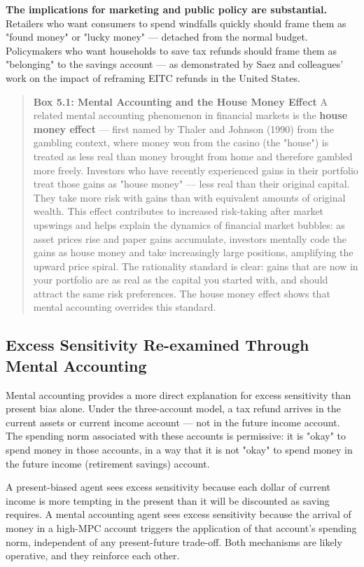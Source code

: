 \documentclass[12pt, letterpaper]{article}
\begin{document}
\textbf{The implications for marketing and public policy are substantial.} Retailers who want consumers to spend windfalls quickly should frame them as "found money" or "lucky money" --- detached from the normal budget. Policymakers who want households to save tax refunds should frame them as "belonging" to the savings account --- as demonstrated by Saez and colleagues' work on the impact of reframing EITC refunds in the United States.

\begin{quote}
\textbf{Box 5.1: Mental Accounting and the House Money Effect}
A related mental accounting phenomenon in financial markets is the \textbf{house money effect} --- first named by Thaler and Johnson (1990) from the gambling context, where money won from the casino (the "house") is treated as less real than money brought from home and therefore gambled more freely.
Investors who have recently experienced gains in their portfolio treat those gains as "house money" --- less real than their original capital. They take more risk with gains than with equivalent amounts of original wealth. This effect contributes to increased risk-taking after market upswings and helps explain the dynamics of financial market bubbles: as asset prices rise and paper gains accumulate, investors mentally code the gains as house money and take increasingly large positions, amplifying the upward price spiral.
The rationality standard is clear: gains that are now in your portfolio are as real as the capital you started with, and should attract the same risk preferences. The house money effect shows that mental accounting overrides this standard.
\end{quote}


\subsection{Excess Sensitivity Re-examined Through Mental Accounting}


Mental accounting provides a more direct explanation for excess sensitivity than present bias alone. Under the three-account model, a tax refund arrives in the current assets or current income account --- not in the future income account. The spending norm associated with these accounts is permissive: it is "okay" to spend money in those accounts, in a way that it is not "okay" to spend money in the future income (retirement savings) account.

A present-biased agent sees excess sensitivity because each dollar of current income is more tempting in the present than it will be discounted as saving requires. A mental accounting agent sees excess sensitivity because the arrival of money in a high-MPC account triggers the application of that account's spending norm, independent of any present-future trade-off. Both mechanisms are likely operative, and they reinforce each other.
\end{document}
